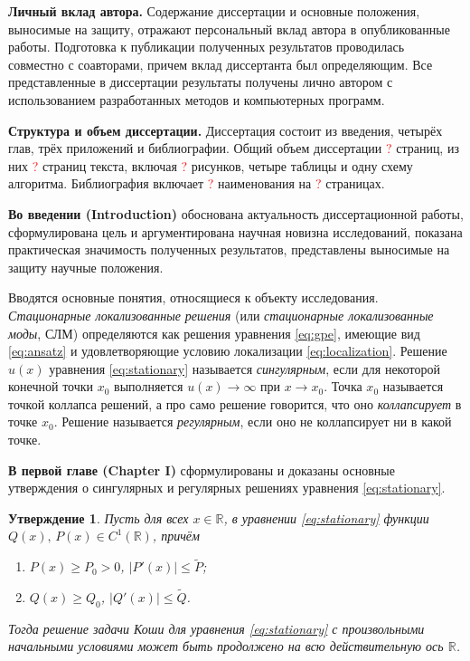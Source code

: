 \documentclass[candidate, href, colorlinks]{disser}
\newtheorem{proposition}{Утверждение}
\begin{document}
\textbf{Личный вклад автора.}
Содержание диссертации и основные положения, выносимые на защиту, отражают персональный вклад автора в опубликованные работы.
Подготовка к публикации полученных результатов проводилась совместно с соавторами, причем вклад диссертанта был определяющим.
Все представленные в диссертации результаты получены лично автором с использованием разработанных методов и компьютерных программ.

\textbf{Структура и объем диссертации.}
Диссертация состоит из введения, четырёх глав, трёх приложений и библиографии.
Общий объем диссертации \textcolor{red}{?} страниц, из них \textcolor{red}{?} страниц текста, включая \textcolor{red}{?} рисунков, четыре таблицы и одну схему алгоритма.
Библиография включает \textcolor{red}{?} наименования на \textcolor{red}{?} страницах.


\textbf{Во введении (Introduction)} обоснована актуальность диссертационной работы, сформулирована цель и аргументирована научная новизна исследований, показана практическая значимость полученных результатов, представлены выносимые на защиту научные положения.

Вводятся основные понятия, относящиеся к объекту исследования.
{\it Стационарные локализованные решения} (или {\it стационарные локализованные моды}, СЛМ) определяются как решения уравнения \eqref{eq:gpe}, имеющие вид \eqref{eq:ansatz} и удовлетворяющие условию локализации \eqref{eq:localization}.
Решение $u(x)$ уравнения \eqref{eq:stationary} называется {\it сингулярным}, если для некоторой конечной точки $x_0$ выполняется $u(x) \to \infty$ при $x \to x_0$.
Точка $x_0$ называется точкой коллапса решений, а про само решение говорится, что оно {\it коллапсирует} в точке $x_0$.
Решение называется {\it регулярным}, если оно не коллапсирует ни в какой точке.

\textbf{В первой главе (Chapter I)} сформулированы и доказаны основные утверждения о сингулярных и регулярных решениях уравнения \eqref{eq:stationary}.

\begin{proposition}
\label{prop:absense-of-singular-solutions}
	Пусть для всех $x \in \mathbb{R}$, в уравнении \eqref{eq:stationary} функции $Q(x), \, P(x) \in C^1(\mathbb{R})$, причём
	\begin{enumerate}
		\item[(a)] $P(x) \ge P_0 > 0$, $|P'(x)| \le \widetilde{P}$;
		\item[(б)] $Q(x) \ge Q_0$, $|Q'(x)| \le \widetilde{Q}$.
	\end{enumerate}
	Тогда решение задачи Коши для уравнения \eqref{eq:stationary} с произвольными начальными условиями может быть продолжено на всю действительную ось $\mathbb{R}$.
\end{proposition}
\end{document}
